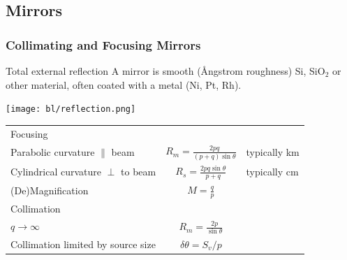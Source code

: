 \documentclass[10pt, xcolor=x11names, compress]{beamer}
\begin{document}
\subsection{Mirrors}
\begin{frame}
  \frametitle{Collimating and Focusing Mirrors}
  \begin{block}{Total external reflection}
    A mirror is smooth ({\AA}ngstrom roughness) Si, SiO$_2$ or other
    material, often coated with a metal (Ni, Pt, Rh).
  \end{block}

    \medskip

  \begin{center}
    \texttt{[image: bl/reflection.png]}

    \medskip

    \begin{tabular}[h]{lcl}
      \multicolumn{3}{l}{\alert{Focusing}}\\[1ex]
      Parabolic curvature $\parallel$ beam & $R_m = \frac{2pq}{(p+q)\sin\theta}$ & typically km \\[1ex]
      Cylindrical curvature $\perp$ to beam & $R_s = \frac{2pq\sin\theta}{p+q} $  & typically cm \\[1ex]
      (De)Magnification & $M = \frac{q}{p}$ & ~ \\[4ex]
      \multicolumn{3}{l}{\alert{Collimation}}\\[1ex]
      $q\rightarrow\infty$ & $R_m = \frac{2p}{\sin\theta} $ & ~ \\[1ex]
      Collimation limited by source size & $\delta\theta = S_v/p$ & ~
    \end{tabular}
  \end{center} 
\end{frame}
\end{document}
